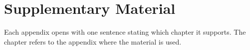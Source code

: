 \chapter{Supplementary Material}
\label{app:supplementary}

%
%

 Each appendix opens
with one sentence stating which chapter it supports. The chapter refers to the appendix
where the material is used.
